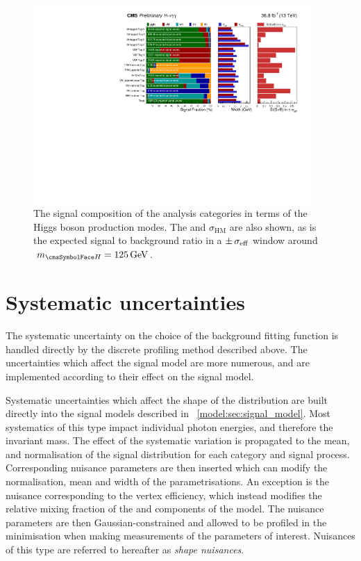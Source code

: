 \begin{figure}
 \begin{center}
 \includegraphics[width=0.95\textwidth]{modellingFigures/yieldsTablePlot.pdf}
 \caption{The signal composition of the analysis categories in terms of the Higgs boson production modes. The \effSigma and $\sigma_{\text{HM}}$ are also shown, as is the expected signal to background ratio in a $\pm \,\sigma_{\text{eff}}$ window around $\mH=125\GeV$.} 
 \label{fig:model:sig_table_visualisation}
 \end{center}
\end{figure}

\section{Systematic uncertainties}
\label{model:sec:systematics}

The systematic uncertainty on the choice of the background fitting function is handled directly by the discrete profiling method described above. The uncertainties which affect the signal model are more numerous, and are implemented according to their effect on the signal model.

Systematic uncertainties which affect the shape of the \mgg distribution are built directly into the signal models described in \Sec~\ref{model:sec:signal_model}. Most systematics of this type impact individual photon energies, and therefore the invariant mass. The effect of the systematic variation is propagated to the mean, \effSigma and normalisation of the signal \mgg distribution for each category and signal process. Corresponding nuisance parameters are then inserted which can modify the normalisation, mean and width of the \DCBpG parametrisations. An exception is the nuisance corresponding to the vertex efficiency, which instead modifies the relative mixing fraction of the \RV and \WV components of the model. The nuisance parameters are then Gaussian-constrained and allowed to be profiled in the \NLL minimisation when making measurements of the parameters of interest. Nuisances of this type are referred to hereafter as \emph{shape nuisances}. 


